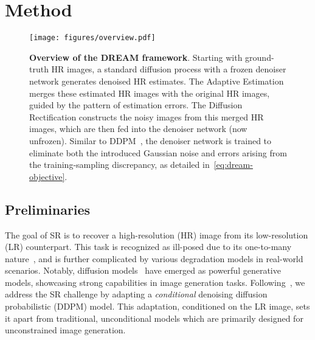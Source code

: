 
\section{Method}
\label{sec:method}


\begin{figure*}
    \centering
\texttt{[image: figures/overview.pdf]}
    \caption{\textbf{Overview of the DREAM framework}. Starting with ground-truth HR images,  a standard diffusion process with a frozen denoiser network generates denoised HR estimates. The \textcolor{pipgreen}{Adaptive Estimation} merges these estimated HR images with the original HR images, guided by the pattern of estimation errors.  The \textcolor{pipblue}{Diffusion Rectification} constructs the noisy images from this merged HR images,  which are then fed into the denoiser network (now unfrozen). Similar to DDPM~\cite{ho2020denoising}, the denoiser network is trained to eliminate both the introduced Gaussian noise and errors arising from the training-sampling discrepancy, as detailed in~\cref{eq:dream-objective}.
   }
    \label{fig:overview}
    \vspace{-.1in}
\end{figure*}





\subsection{Preliminaries}\label{subsec:3.1}

The goal of SR is to recover a high-resolution (HR) image from its low-resolution (LR) counterpart. This task is recognized as ill-posed due to its one-to-many nature~\cite{saharia2022image,yue2023resshift}, and is further complicated by various degradation models in real-world scenarios. Notably, diffusion models~\cite{sohl2015deep, ho2020denoising} have emerged as powerful generative models, showcasing strong capabilities in image generation tasks. Following~\cite{saharia2022image}, we address the SR challenge by adapting a \emph{conditional} denoising diffusion probabilistic
(DDPM) model. This adaptation, conditioned on the LR image, sets it apart from traditional, unconditional models which are primarily designed for unconstrained image generation.

